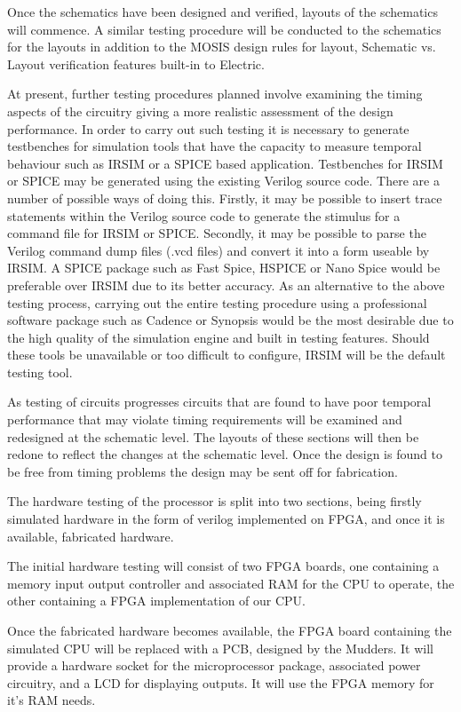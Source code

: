 Once the schematics have been designed and verified, layouts of the schematics will commence. A similar testing procedure will be conducted to the schematics for the layouts in addition to the MOSIS design rules for layout, Schematic vs. Layout verification features built-in to Electric.

At present, further testing procedures planned involve examining the timing aspects of the circuitry giving a more realistic assessment of the design performance. In order to carry out such testing it is necessary to generate testbenches for simulation tools that have the capacity to measure temporal behaviour such as IRSIM or a SPICE based application. Testbenches for IRSIM or SPICE may be generated using the existing Verilog source code. There are a number of possible ways of doing this. Firstly, it may be possible to insert trace statements within the Verilog source code to generate the stimulus for a command file for IRSIM or SPICE. Secondly, it may be possible to parse the Verilog command dump files (.vcd files) and convert it into a form useable by IRSIM. A SPICE package such as Fast Spice, HSPICE or Nano Spice would be preferable over IRSIM due to its better accuracy. As an alternative to the above testing process, carrying out the entire testing procedure using a professional software package such as Cadence or Synopsis would be the most desirable due to the high quality of the simulation engine and built in testing features. Should these tools be unavailable or too difficult to configure, IRSIM will be the default testing tool.

As testing of circuits progresses circuits that are found to have poor temporal performance that may violate timing requirements will be examined and redesigned at the schematic level. The layouts of these sections will then be redone to reflect the changes at the schematic level. Once the design is found to be free from timing problems the design may be sent off for fabrication.

The hardware testing of the processor is split into two sections, being firstly simulated hardware in the form of verilog implemented on FPGA, and once it is available, fabricated hardware.

The initial hardware testing will consist of two FPGA boards, one containing a memory input output controller and associated RAM for the CPU to operate, the other containing a FPGA implementation of our CPU.

Once the fabricated hardware becomes available, the FPGA board containing the simulated CPU will be replaced with a PCB, designed by the Mudders. It will provide a hardware socket for the microprocessor package, associated power circuitry, and a LCD for displaying outputs. It will use the FPGA memory for it's RAM needs.

